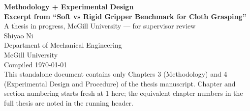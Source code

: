 \documentclass[letter,12pt,oneside]{book}
\begin{document}
\begin{titlepage}
\begin{center}
\vspace*{3cm}
{\sf\bfseries\LARGE Methodology + Experimental Design}\\[0.4cm]
{\sf\bfseries\Large Excerpt from ``Soft vs Rigid Gripper Benchmark for Cloth Grasping''}\\[0.3cm]
{\large A thesis in progress, McGill University --- for supervisor review}\\[1cm]
{\large Shiyao Ni}\\[0.5cm]
Department of Mechanical Engineering\\
McGill University\\[1cm]
{\small Compiled \today}\\[0.5cm]
{\small This standalone document contains only Chapters 3 (Methodology) and 4 (Experimental Design and Procedure) of the thesis manuscript. Chapter and section numbering starts fresh at 1 here; the equivalent chapter numbers in the full thesis are noted in the running header.}
\end{center}
\end{titlepage}

\tableofcontents
\clearpage


\clearpage

\setcounter{chapter}{0}



\end{document}
